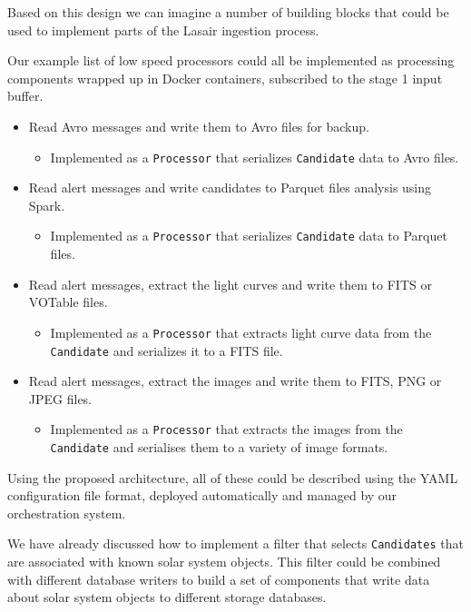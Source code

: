 \documentclass{article}
\newcommand{\yaml} {YAML\xspace}
\newcommand{\avro} {Avro\xspace}
\newcommand{\fits} {FITS\xspace}
\newcommand{\png} {PNG\xspace}
\newcommand{\jpeg} {JPEG\xspace}
\newcommand{\parquet} {Parquet\xspace}
\newcommand{\votable} {VOTable\xspace}
\newcommand{\docker} {Docker\xspace}
\newcommand{\spark} {Spark\xspace}
\newcommand{\stageone} {stage 1\xspace}
\newcommand{\lasair} {Lasair\xspace}
\begin{document}
Based on this design we can imagine a number of building blocks that could be used to implement parts of the \lasair ingestion process.

Our example list of low speed processors could all be implemented as processing components wrapped up in \docker containers, subscribed to the \stageone input buffer.

\begin{itemize}
  \item Read \avro messages and write them to \avro files for backup.
  \begin{itemize}
    \item Implemented as a \texttt{Processor} that serializes \texttt{Candidate} data to \avro files.
  \end{itemize}

  \item Read alert messages and write candidates to \parquet files analysis using \spark.
  \begin{itemize}
    \item Implemented as a \texttt{Processor} that serializes \texttt{Candidate} data to \parquet files.
  \end{itemize}

  \item Read alert messages, extract the light curves and write them to \fits or \votable files.
  \begin{itemize}
    \item Implemented as a \texttt{Processor} that extracts light curve data from the \texttt{Candidate} and serializes it to a \fits file.
  \end{itemize}

  \item Read alert messages, extract the images and write them to \fits, \png or \jpeg files.
  
  \begin{itemize}
    \item Implemented as a \texttt{Processor} that extracts the images from the \texttt{Candidate} and serialises them to a variety of image formats.
  \end{itemize}
\end{itemize}

Using the proposed architecture, all of these could be described using the \yaml configuration file format, deployed automatically and managed by our orchestration system.

We have already discussed how to implement a filter that selects \texttt{Candidates} that are associated with known solar system objects. This filter could be combined with different database writers to build a set of components that write data about solar system objects to different storage databases.
\end{document}
